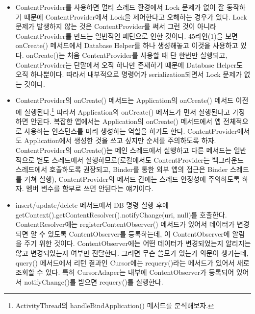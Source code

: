 \begin{itemize}
\item ContentProvider를 사용하면 멀티 스레드 환경에서 Lock 문제가 없이 잘 동작하기 때문에 ContentProvider에서 Lock을 제어한다고 오해하는 경우가 있다. 
Lock 문제가 발생하지 않는 것은 ContentProvider를 써서 그런 것이 아니라 ContentProvider를 만드는 일반적인 패턴으로 인한 것이다.
45라인(1)을 보면 onCreate() 메서드에서 Database Helper를 하나 생성해놓고 이것을 사용하고 있다.
onCreate()는 처음 ContentProvider를 사용할 때 단 한번만 실행되고, ContentProvider는 단말에서 오직 하나만 존재하기 때문에 Database Helper도 오직 하나뿐이다. 따라서 내부적으로 명령어가 serialization되면서 Lock 문제가 없는 것이다.

\item ContentProvider의 onCreate() 메서드는 Application의 onCreate() 메서드 이전에 실행된다.\footnote{ActivityThread의 handleBindApplication() 메서드를 분석해보자.}
따라서 Application의 onCreate() 메서드가 먼저 실행된다고 가정하면 안된다.
복잡한 앱에서는 Application의 onCreate() 메서드에서 앱 전체적으로 사용하는 인스턴스를 미리 생성하는 역할을 하기도 한다. ContentProvider에서도 Application에서 생성한 것을 쓰고 싶지만 순서를 주의하도록 하자.
ContentProvider의 onCreate()는 메인 스레드에서 실행하고 다른 메서드는 일반적으로 별도 스레드에서 실행하므로(로컬에서도 ContentProvider는 백그라운드 스레드에서 호출하도록 권장되고, Binder를 통한 외부 앱의 접근은 Binder 스레드를 거쳐 실행), ContentProvider의 메서드 간에는 스레드 안정성에 주의하도록 하자. 멤버 변수를 함부로 쓰면 안된다는 얘기이다.

\item insert/update/delete 메서드에서 DB 명령 실행 후에 getContext().getContentResolver().notifyChange(uri, null)를 호출한다. 
ContentResolver에는 registerContentObserver() 메서드가 있어서 데이터가 변경되면 알 수 있도록 ContentObserver를 등록하는데, 이 ContentObserver에 알림을 주기 위한 것이다. 
ContentObserver에는 어떤 데이터가 변경되었는지 알리지는 않고 변경되었는지 여부만 전달한다. 
그러면 무슨 쓸모가 있는가 의문이 생기는데,
query() 메서드에서 리턴 결과인 Cursor에는 requery()라는 메서드가 있어서 새로 조회할 수 있다. 특히 CursorAdaper는 내부에 ContentObserver가 등록되어 있어서 notifyChange()를 받으면 requery()를 실행한다.

\end{itemize}

